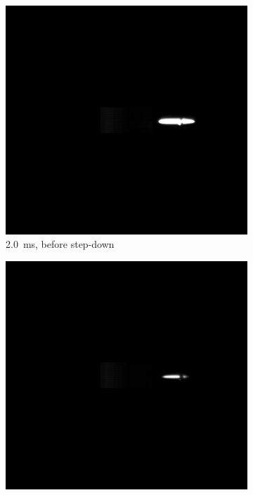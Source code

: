             \begin{figure}[h]
                \centering
                \begin{subfigure}[t]{0.32\textwidth}
                    \centering
                    \includegraphics[trim=7.6in 5.3in 2.4in 5.5in, clip, width=\textwidth]{assets/5 results/LSP34_PS28/20.jpg}
                    \caption{\qty{2.0}{ms}, before step-down}
                    \label{fig:lsp_stepdown_20}
                \end{subfigure}
                \hfill
                \begin{subfigure}[t]{0.32\textwidth}
                    \centering
                    \includegraphics[trim=7.6in 5.3in 2.4in 5.5in, clip, width=\textwidth]{assets/5 results/LSP34_PS28/21.jpg}

\end{subfigure}
\end{figure}
